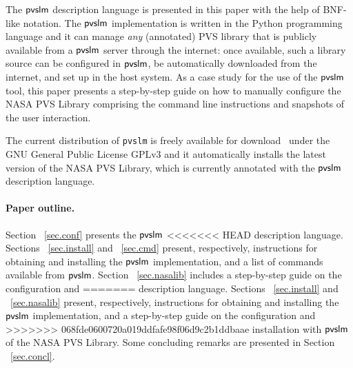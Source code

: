 The $\textsf{pvslm}$ description language is presented in this paper with the
help of BNF-like notation. The $\textsf{pvslm}$ implementation is written in
the Python programming language and it can manage {\em any}
(annotated) PVS library that is publicly available from a $\textsf{pvslm}$
server through the internet: once available, such a library source can
be configured in $\textsf{pvslm}$, be automatically downloaded from the
internet, and set up in the host system. As a case study for the use
of the $\textsf{pvslm}$ tool, this paper presents a step-by-step guide on how
to manually configure the NASA PVS Library comprising the command line
instructions and snapshots of the user interaction.

The current distribution of \verb$pvslm$ is freely available for
download~\cite{pvslm} under the GNU General Public License GPLv3 and
it automatically installs the latest version of the NASA PVS Library,
which is currently annotated with the $\textsf{pvslm}$ description language.

\paragraph{Paper outline.} Section ~\ref{sec.conf} presents the $\textsf{pvslm}$ 
<<<<<<< HEAD
description language. Sections ~\ref{sec.install} and ~\ref{sec.cmd} 
present, respectively, instructions for obtaining and installing the $\textsf{pvslm}$ 
implementation, and a list of commands available from $\textsf{pvslm}$. 
Section ~\ref{sec.nasalib} includes a step-by-step guide on the configuration and
=======
description language. Sections ~\ref{sec.install} and ~\ref{sec.nasalib} 
present, respectively, instructions for obtaining and installing the $\textsf{pvslm}$ 
implementation, and a step-by-step guide on the configuration and
>>>>>>> 068fde0600720a019ddfafe98f06d9c2b1ddbaae
installation with $\textsf{pvslm}$ of the NASA PVS Library. Some concluding
remarks are presented in Section ~\ref{sec.concl}.
